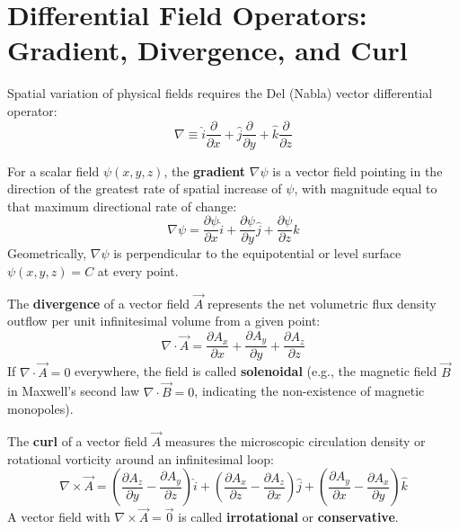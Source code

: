 \section{Differential Field Operators: Gradient, Divergence, and Curl}
Spatial variation of physical fields requires the Del (Nabla) vector differential operator:
\begin{equation}
\nabla \equiv \hat{i}\frac{\partial}{\partial x} + \hat{j}\frac{\partial}{\partial y} + \hat{k}\frac{\partial}{\partial z}
\end{equation}

\begin{mathdefinition}
For a scalar field $\psi(x, y, z)$, the \textbf{gradient} $\nabla \psi$ is a vector field pointing in the direction of the greatest rate of spatial increase of $\psi$, with magnitude equal to that maximum directional rate of change:
\begin{equation}
\nabla \psi = \frac{\partial \psi}{\partial x}\hat{i} + \frac{\partial \psi}{\partial y}\hat{j} + \frac{\partial \psi}{\partial z}\hat{k}
\end{equation}
Geometrically, $\nabla \psi$ is perpendicular to the equipotential or level surface $\psi(x, y, z) = C$ at every point.
\end{mathdefinition}

\begin{mathdefinition}
The \textbf{divergence} of a vector field $\vec{A}$ represents the net volumetric flux density outflow per unit infinitesimal volume from a given point:
\begin{equation}
\nabla \cdot \vec{A} = \frac{\partial A_x}{\partial x} + \frac{\partial A_y}{\partial y} + \frac{\partial A_z}{\partial z}
\end{equation}
If $\nabla \cdot \vec{A} = 0$ everywhere, the field is called \textbf{solenoidal} (e.g., the magnetic field $\vec{B}$ in Maxwell's second law $\nabla \cdot \vec{B} = 0$, indicating the non-existence of magnetic monopoles).
\end{mathdefinition}

\begin{mathdefinition}
The \textbf{curl} of a vector field $\vec{A}$ measures the microscopic circulation density or rotational vorticity around an infinitesimal loop:
\begin{equation}
\nabla \times \vec{A} = \left(\frac{\partial A_z}{\partial y} - \frac{\partial A_y}{\partial z}\right)\hat{i} + \left(\frac{\partial A_x}{\partial z} - \frac{\partial A_z}{\partial x}\right)\hat{j} + \left(\frac{\partial A_y}{\partial x} - \frac{\partial A_x}{\partial y}\right)\hat{k}
\end{equation}
A vector field with $\nabla \times \vec{A} = \vec{0}$ is called \textbf{irrotational} or \textbf{conservative}.
\end{mathdefinition}

